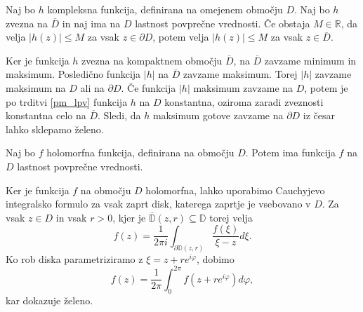 \documentclass[mat1, tisk]{fmfdelo}
\begin{document}
    \begin{posledica}
        \label{posledica_pm_lpv}
        Naj bo $h$  kompleksna funkcija, definirana na omejenem območju $D$. Naj bo $h$ zvezna na $\overline{D}$ in naj ima na $D$ lastnost povprečne vrednosti. 
        Če obstaja $M \in \mathbb{R}$, da velja $|h(z)| \leq M$ za vsak $z \in \partial D$, potem velja $|h(z)| \leq M$ za vsak $z \in \overline{D}$. 
    \end{posledica}
    \begin{dokaz}
        Ker je funkcija $h$ zvezna na kompaktnem območju $\overline{D}$, na $\overline{D}$ zavzame minimum in maksimum. Posledično funkcija $|h|$ na $\overline{D}$ zavzame maksimum. 
        Torej $|h|$ zavzame maksimum na $D$ ali na $\partial D$. Če funkcija $|h|$ maksimum zavzame na $D$, potem je po trditvi \ref{pm_lpv} funkcija $h$ na $D$ konstantna, oziroma zaradi zveznosti konstantna celo na $\overline{D}$. 
        Sledi, da $h$ maksimum gotove zavzame na $\partial D$ iz česar lahko sklepamo želeno.
    \end{dokaz}

    \begin{trditev}
        \label{hol_lpv}
        Naj bo $f$ holomorfna funkcija, definirana na območju $D$. Potem ima funkcija $f$ na $D$ lastnost povprečne vrednosti.
    \end{trditev}
    \begin{dokaz}
        Ker je funkcija $f$ na območju $D$ holomorfna, lahko uporabimo Cauchyjevo integralsko formulo za vsak zaprt disk, katerega zaprtje je vsebovano v $D$. Za vsak $z \in D$ in vsak $r > 0$, kjer je $\overline{\mathbb{D}}(z,r) \subseteq \mathbb{D}$ torej velja
        $$
        f(z) = \frac{1}{2 \pi i} \int_{\partial \mathbb{D}(z, r)}{\frac{f(\xi)}{\xi  - z}}d\xi.
        $$
        Ko rob diska parametriziramo z $\xi = z + r e^{i \varphi}$, dobimo
        $$
        f(z) = \frac{1}{2 \pi} \int_{0}^{2\pi}{f(z + re^{i\varphi})}d\varphi, 
        $$
        kar dokazuje želeno.
    \end{dokaz}
\end{document}
